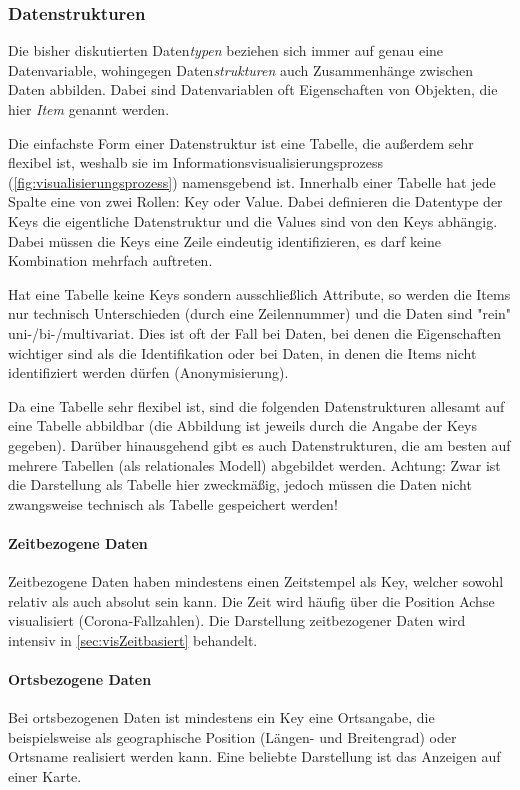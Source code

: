 			\subsubsection{Datenstrukturen}
				Die bisher diskutierten Daten\emph{typen} beziehen sich immer auf genau eine Datenvariable, wohingegen Daten\emph{strukturen} auch Zusammenhänge zwischen Daten abbilden. Dabei sind Datenvariablen oft Eigenschaften von Objekten, die hier \emph{Item} genannt werden.

				Die einfachste Form einer Datenstruktur ist eine Tabelle, die außerdem sehr flexibel ist, weshalb sie im Informationsvisualisierungsprozess (\autoref{fig:visualisierungsprozess}) namensgebend ist. Innerhalb einer Tabelle hat jede Spalte eine von zwei Rollen: Key oder Value. Dabei definieren die Datentype der Keys die eigentliche Datenstruktur und die Values sind von den Keys abhängig. Dabei müssen die Keys eine Zeile eindeutig identifizieren, \dh es darf keine Kombination mehrfach auftreten.

				Hat eine Tabelle keine Keys sondern ausschließlich Attribute, so werden die Items nur technisch Unterschieden (\bspw durch eine Zeilennummer) und die Daten sind "rein" uni-/bi-/multivariat. Dies ist oft der Fall bei Daten, bei denen die Eigenschaften wichtiger sind als die Identifikation oder bei Daten, in denen die Items nicht identifiziert werden dürfen (Anonymisierung).

				Da eine Tabelle sehr flexibel ist, sind die folgenden Datenstrukturen allesamt auf eine Tabelle abbildbar (die Abbildung ist jeweils durch die Angabe der Keys gegeben). Darüber hinausgehend gibt es auch Datenstrukturen, die am besten auf mehrere Tabellen (als relationales Modell) abgebildet werden. Achtung: Zwar ist die Darstellung als Tabelle hier zweckmäßig, jedoch müssen die Daten nicht zwangsweise technisch als Tabelle gespeichert werden!

				\paragraph{Zeitbezogene Daten}
					Zeitbezogene Daten haben mindestens einen Zeitstempel als Key, welcher sowohl relativ als auch absolut sein kann. Die Zeit wird häufig über die Position Achse visualisiert (\zB Corona-Fallzahlen). Die Darstellung zeitbezogener Daten wird intensiv in \autoref{sec:visZeitbasiert} behandelt.

				\paragraph{Ortsbezogene Daten}
					Bei ortsbezogenen Daten ist mindestens ein Key eine Ortsangabe, die beispielsweise als geographische Position (Längen- und Breitengrad) oder Ortsname realisiert werden kann. Eine beliebte Darstellung ist das Anzeigen auf einer Karte.

